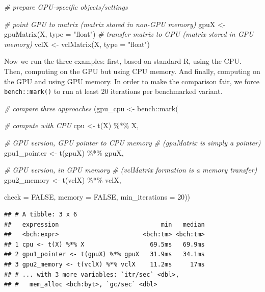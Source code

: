 \documentclass[
  12pt,
]{style/krantz}
\newenvironment{Shaded}{\begin{snugshade}}{\end{snugshade}}
\newcommand{\AttributeTok}[1]{\textcolor[rgb]{0.77,0.63,0.00}{#1}}
\newcommand{\CommentTok}[1]{\textcolor[rgb]{0.56,0.35,0.01}{\textit{#1}}}
\newcommand{\ConstantTok}[1]{\textcolor[rgb]{0.00,0.00,0.00}{#1}}
\newcommand{\DecValTok}[1]{\textcolor[rgb]{0.00,0.00,0.81}{#1}}
\newcommand{\FunctionTok}[1]{\textcolor[rgb]{0.00,0.00,0.00}{#1}}
\newcommand{\NormalTok}[1]{#1}
\newcommand{\OtherTok}[1]{\textcolor[rgb]{0.56,0.35,0.01}{#1}}
\newcommand{\SpecialCharTok}[1]{\textcolor[rgb]{0.00,0.00,0.00}{#1}}
\newcommand{\StringTok}[1]{\textcolor[rgb]{0.31,0.60,0.02}{#1}}
\begin{document}
\begin{Shaded}
\begin{Highlighting}[]
\CommentTok{\# prepare GPU{-}specific objects/settings}

\CommentTok{\# point GPU to matrix (matrix stored in non{-}GPU memory)}
\NormalTok{gpuX }\OtherTok{\textless{}{-}} \FunctionTok{gpuMatrix}\NormalTok{(X, }\AttributeTok{type =} \StringTok{"float"}\NormalTok{)}
\CommentTok{\# transfer matrix to GPU (matrix stored in GPU memory)}
\NormalTok{vclX }\OtherTok{\textless{}{-}} \FunctionTok{vclMatrix}\NormalTok{(X, }\AttributeTok{type =} \StringTok{"float"}\NormalTok{)  }
\end{Highlighting}
\end{Shaded}

Now we run the three examples: first, based on standard R, using the CPU. Then, computing on the GPU but using CPU memory. And finally, computing on the GPU and using GPU memory. In order to make the comparison fair, we force \texttt{bench::mark()} to run at least 20 iterations per benchmarked variant.

\begin{Shaded}
\begin{Highlighting}[]
\CommentTok{\# compare three approaches}
\NormalTok{(gpu\_cpu }\OtherTok{\textless{}{-}}\NormalTok{ bench}\SpecialCharTok{::}\FunctionTok{mark}\NormalTok{(}
  
  \CommentTok{\# compute with CPU }
\NormalTok{  cpu }\OtherTok{\textless{}{-}} \FunctionTok{t}\NormalTok{(X) }\SpecialCharTok{\%*\%}\NormalTok{ X,}
  
  \CommentTok{\# GPU version, GPU pointer to CPU memory }
  \CommentTok{\# (gpuMatrix is simply a pointer)}
\NormalTok{  gpu1\_pointer }\OtherTok{\textless{}{-}} \FunctionTok{t}\NormalTok{(gpuX) }\SpecialCharTok{\%*\%}\NormalTok{ gpuX,}
  
  \CommentTok{\# GPU version, in GPU memory }
  \CommentTok{\# (vclMatrix formation is a memory transfer)}
\NormalTok{  gpu2\_memory }\OtherTok{\textless{}{-}} \FunctionTok{t}\NormalTok{(vclX) }\SpecialCharTok{\%*\%}\NormalTok{ vclX,}
 
\AttributeTok{check =} \ConstantTok{FALSE}\NormalTok{, }\AttributeTok{memory =} \ConstantTok{FALSE}\NormalTok{, }\AttributeTok{min\_iterations =} \DecValTok{20}\NormalTok{))}
\end{Highlighting}
\end{Shaded}

\begin{verbatim}
## # A tibble: 3 x 6
##   expression                            min   median
##   <bch:expr>                       <bch:tm> <bch:tm>
## 1 cpu <- t(X) %*% X                  69.5ms   69.9ms
## 2 gpu1_pointer <- t(gpuX) %*% gpuX   31.9ms   34.1ms
## 3 gpu2_memory <- t(vclX) %*% vclX    11.2ms     17ms
## # ... with 3 more variables: `itr/sec` <dbl>,
## #   mem_alloc <bch:byt>, `gc/sec` <dbl>
\end{verbatim}
\end{document}
